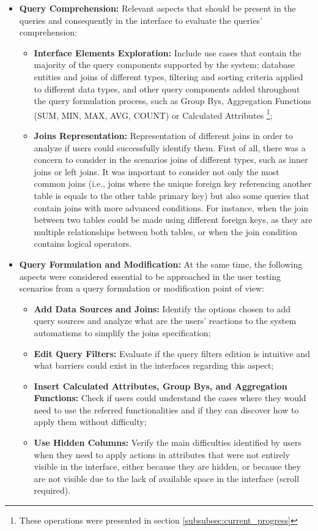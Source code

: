\begin{itemize}
    \item \textbf{Query Comprehension: }Relevant aspects that should be present in the queries and consequently in the interface to evaluate the queries' comprehension:
    \begin{itemize}
        \item \textbf{Interface Elements Exploration: }Include use cases that contain the majority of the query components supported by the system: database entities and joins of different types, filtering and sorting criteria applied to different data types, and other query components added throughout the query formulation process, such as Group Bys, Aggregation Functions (SUM, MIN, MAX, AVG, COUNT) or Calculated Attributes \footnote{These operations were presented in section \ref{subsubsec:current_progress}};
        \item \textbf{Joins Representation: }Representation of different joins in order to analyze if users could successfully identify them. First of all, there was a concern to consider in the scenarios joins of different types, such as inner joins or left joins. It was important to consider not only the most common joins (i.e., joins where the unique foreign key referencing another table is equals to the other table primary key) but also some queries that contain joins with more advanced conditions. For instance, when the join between two tables could be made using different foreign keys, as they are multiple relationships between both tables, or when the join condition contains logical operators.
    \end{itemize}
    \item \textbf{Query Formulation and Modification: }At the same time, the following aspects were considered essential to be approached in the user testing scenarios from a query formulation or modification point of view:
    \begin{itemize}
        \item \textbf{Add Data Sources and Joins: }Identify the options chosen to add query sources and analyze what are the users' reactions to the system automatisms to simplify the joins specification;
        \item \textbf{Edit Query Filters: }Evaluate if the query filters edition is intuitive and what barriers could exist in the interfaces regarding this aspect;
        \item \textbf{Insert Calculated Attributes, Group Bys, and Aggregation Functions: }Check if users could understand the cases where they would need to use the referred functionalities and if they can discover how to apply them without difficulty;
        \item \textbf{Use Hidden Columns: }Verify the main difficulties identified by users when they need to apply actions in attributes that were not entirely visible in the interface, either because they are hidden, or because they are not visible due to the lack of available space in the interface (scroll required).
    \end{itemize}
\end{itemize}

